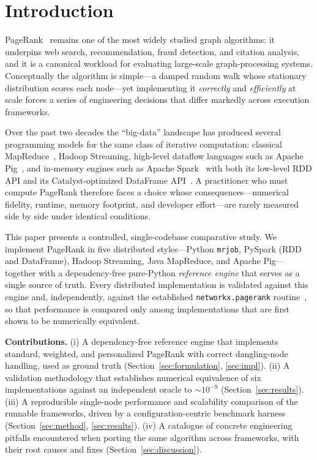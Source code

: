 
\section{Introduction}
PageRank~\cite{brin1998,page1999} remains one of the most widely studied graph
algorithms: it underpins web search, recommendation, fraud detection, and
citation analysis, and it is a canonical workload for evaluating large-scale
graph-processing systems. Conceptually the algorithm is simple---a damped random
walk whose stationary distribution scores each node---yet implementing it
\emph{correctly} and \emph{efficiently} at scale forces a series of engineering
decisions that differ markedly across execution frameworks.

Over the past two decades the ``big-data'' landscape has produced several
programming models for the same class of iterative computation: classical
MapReduce~\cite{dean2008}, Hadoop Streaming, high-level dataflow languages such
as Apache Pig~\cite{olston2008}, and in-memory engines such as Apache
Spark~\cite{zaharia2012} with both its low-level RDD API and its
Catalyst-optimized DataFrame API~\cite{armbrust2015}. A practitioner who must
compute PageRank therefore faces a choice whose consequences---numerical
fidelity, runtime, memory footprint, and developer effort---are rarely measured
side by side under identical conditions.

This paper presents a controlled, single-codebase comparative study. We
implement PageRank in five distributed styles---Python \texttt{mrjob}, PySpark
(RDD and DataFrame), Hadoop Streaming, Java MapReduce, and Apache Pig---together
with a dependency-free pure-Python \emph{reference engine} that serves as a
single source of truth. Every distributed implementation is validated against
this engine and, independently, against the established
\texttt{networkx.pagerank} routine~\cite{hagberg2008}, so that performance is
compared only among implementations that are first shown to be numerically
equivalent.

\noindent\textbf{Contributions.} (i) A dependency-free reference engine that
implements standard, weighted, and personalized PageRank with correct
dangling-node handling, used as ground truth (Section~\ref{sec:formulation},
\ref{sec:impl}). (ii) A validation methodology that establishes numerical
equivalence of six implementations against an independent oracle to
$\sim\!10^{-9}$ (Section~\ref{sec:results}). (iii) A reproducible single-node
performance and scalability comparison of the runnable frameworks, driven by a
configuration-centric benchmark harness (Section~\ref{sec:method},
\ref{sec:results}). (iv) A catalogue of concrete engineering pitfalls
encountered when porting the same algorithm across frameworks, with their root
causes and fixes (Section~\ref{sec:discussion}).

